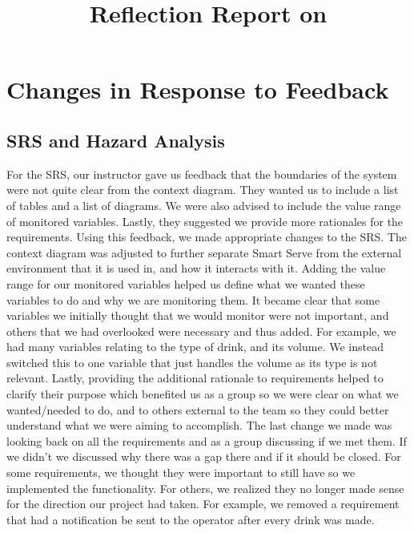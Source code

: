 \documentclass{article}
\title{Reflection Report on \progname}
\author{\authname}
\date{}
\begin{document}
\maketitle

\section{Changes in Response to Feedback}

\subsection{SRS and Hazard Analysis}
For the SRS, our instructor gave us feedback that the boundaries of the system were not quite clear from the context diagram. They wanted us to include a list of tables and a list of diagrams. We were also advised to include the value range of monitored variables. Lastly, they suggested we provide more rationales for the requirements. Using this feedback, we made appropriate changes to the SRS. The context diagram was adjusted to further separate Smart Serve from the external environment that it is used in, and how it interacts with it. Adding the value range for our monitored variables helped us define what we wanted these variables to do and why we are monitoring them. It became clear that some variables we initially thought that we would monitor were not important, and others that we had overlooked were necessary and thus added. For example, we had many variables relating to the type of drink, and its volume. We instead switched this to one variable that just handles the volume as its type is not relevant. Lastly, providing the additional rationale to requirements helped to clarify their purpose which benefited us as a group so we were clear on what we wanted/needed to do, and to others external to the team so they could better understand what we were aiming to accomplish. The last change we made was looking back on all the requirements and as a group discussing if we met them. If we didn't we discussed why there was a gap there and if it should be closed. For some requirements, we thought they were important to still have so we implemented the functionality. For others, we realized they no longer made sense for the direction our project had taken. For example, we removed a requirement that had a notification be sent to the operator after every drink was made.\\
\end{document}
